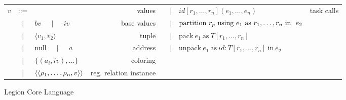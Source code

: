 \begin{figure*}
{\begin{tabular}{cclr|cclr}
$v$ & ::= & & values &   
       & $\mid$& $id[r_1, \ldots, r_n](e_1,\ldots,e_n)$ & task calls \\
  &$\mid$& $bv$ $\;\;\;\mid\;\;\;$ $iv$ & base values &   
       & $\mid$ & $\text{partition}\ r_p\text{ using }e_1\text{ as }{r}_1,\ldots,{r}_n\text{ in }\ e_2$ &  \\
  &$\mid$& $\langle v_1, v_2 \rangle$ & tuple & 
       & $\mid$& $\text{pack}\ e_1\ \text{as}\ T[r_1,\ldots,r_n]$ &  \\
  &$\mid$& null $\;\;\;\mid\;\;\;$ $a$ & address & 
       & $\mid$& $\text{unpack}\ e_1\ \text{as}\ id : T[r_1,\ldots,r_n]\ \text{in}\ e_2$ &  \\
  &$\mid$& $\{ (a_i, iv), \ldots \}$ & coloring & 
    & & & \\
  &$\mid$& $\langle \langle {\rho}_1,\ldots,{\rho}_n, v\rangle \rangle$ & reg. relation instance & 
   & & & \\
\end{tabular}
}
\caption{Legion Core Language}
\label{fig:langdef}
\end{figure*}

